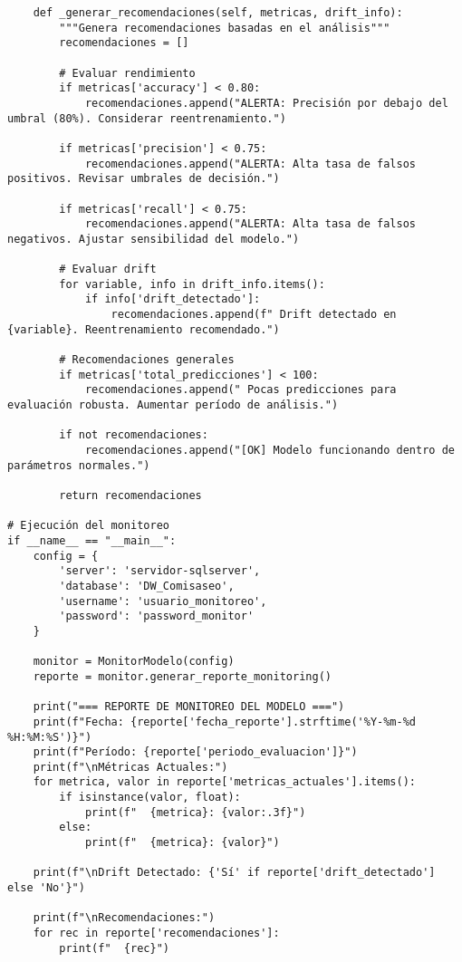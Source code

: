 \begin{verbatim}
    def _generar_recomendaciones(self, metricas, drift_info):
        """Genera recomendaciones basadas en el análisis"""
        recomendaciones = []
        
        # Evaluar rendimiento
        if metricas['accuracy'] < 0.80:
            recomendaciones.append("ALERTA: Precisión por debajo del umbral (80%). Considerar reentrenamiento.")
        
        if metricas['precision'] < 0.75:
            recomendaciones.append("ALERTA: Alta tasa de falsos positivos. Revisar umbrales de decisión.")
        
        if metricas['recall'] < 0.75:
            recomendaciones.append("ALERTA: Alta tasa de falsos negativos. Ajustar sensibilidad del modelo.")
        
        # Evaluar drift
        for variable, info in drift_info.items():
            if info['drift_detectado']:
                recomendaciones.append(f" Drift detectado en {variable}. Reentrenamiento recomendado.")
        
        # Recomendaciones generales
        if metricas['total_predicciones'] < 100:
            recomendaciones.append(" Pocas predicciones para evaluación robusta. Aumentar período de análisis.")
        
        if not recomendaciones:
            recomendaciones.append("[OK] Modelo funcionando dentro de parámetros normales.")
        
        return recomendaciones

# Ejecución del monitoreo
if __name__ == "__main__":
    config = {
        'server': 'servidor-sqlserver',
        'database': 'DW_Comisaseo',
        'username': 'usuario_monitoreo',
        'password': 'password_monitor'
    }
    
    monitor = MonitorModelo(config)
    reporte = monitor.generar_reporte_monitoring()
    
    print("=== REPORTE DE MONITOREO DEL MODELO ===")
    print(f"Fecha: {reporte['fecha_reporte'].strftime('%Y-%m-%d %H:%M:%S')}")
    print(f"Período: {reporte['periodo_evaluacion']}")
    print(f"\nMétricas Actuales:")
    for metrica, valor in reporte['metricas_actuales'].items():
        if isinstance(valor, float):
            print(f"  {metrica}: {valor:.3f}")
        else:
            print(f"  {metrica}: {valor}")
    
    print(f"\nDrift Detectado: {'Sí' if reporte['drift_detectado'] else 'No'}")
    
    print(f"\nRecomendaciones:")
    for rec in reporte['recomendaciones']:
        print(f"  {rec}")
\end{verbatim}
